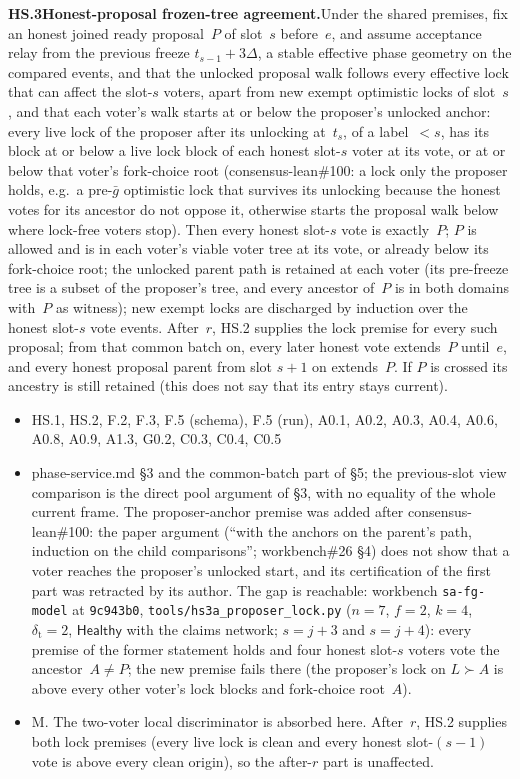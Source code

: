 \documentclass{article}
\newcommand{\dagnode}[6]{%
\par\medskip\noindent\textbf{#1\enspace #2.}\enspace #3
\begin{itemize}[leftmargin=2.2em,itemsep=0pt,topsep=2pt]
\item[\emph{Uses}] #4
\item[\emph{Evid.}] #5
\item[\emph{Task}] #6
\end{itemize}}
\begin{document}
\dagnode{HS.3}{Honest-proposal frozen-tree agreement}{Under the shared
premises, fix an honest joined ready proposal~$P$ of slot~$s$ before~$e$, and
assume acceptance relay from the previous freeze $t_{s-1}+3\Delta$, a stable
effective phase geometry on the compared events, and that the unlocked
proposal walk follows every effective lock that can affect the slot-$s$
voters, apart from new exempt optimistic locks of slot~$s$, and that each
voter's walk starts at or below the proposer's unlocked anchor: every live lock
of the proposer after its unlocking at~$t_s$, of a label~$<s$, has its block at
or below a live lock block of each honest slot-$s$ voter at its vote, or at or
below that voter's fork-choice root (consensus-lean\#100: a lock only the
proposer holds, e.g.\ a pre-$\bar g$ optimistic lock that survives its unlocking
because the honest votes for its ancestor do not oppose it, otherwise starts the
proposal walk below where lock-free voters stop).  Then every honest
slot-$s$ vote is exactly~$P$; $P$ is allowed and is in each voter's viable
voter tree at its vote, or already below its fork-choice root; the unlocked
parent path is retained at each voter (its pre-freeze tree is a subset of the
proposer's tree, and every ancestor of~$P$ is in both domains with~$P$ as
witness); new exempt locks are discharged by induction over the honest
slot-$s$ vote events.  After~$r$, HS.2 supplies the lock premise for every
such proposal; from that common batch on, every later honest vote extends~$P$
until~$e$, and every honest proposal parent from slot $s+1$ on extends~$P$.
If $P$ is crossed its ancestry is still retained (this does not say that its
entry stays current).}
{HS.1, HS.2, F.2, F.3, F.5 (schema), F.5 (run), A0.1, A0.2, A0.3, A0.4,
A0.6, A0.8, A0.9, A1.3, G0.2, C0.3, C0.4, C0.5}{phase-service.md \S3 and the
common-batch part of \S5; the previous-slot view comparison is the direct
pool argument of \S3, with no equality of the whole current frame.  The
proposer-anchor premise was added after consensus-lean\#100: the paper argument
(``with the anchors on the parent's path, induction on the child comparisons'';
workbench\#26 \S4) does not show that a voter reaches the proposer's unlocked
start, and its certification of the first part was retracted by its author.
The gap is reachable: workbench \texttt{sa-fg-model} at \texttt{9c943b0},
\texttt{tools/hs3a\_proposer\_lock.py} ($n=7$, $f=2$, $k=4$, $\delta_{\mathrm t}=2$,
$\mathsf{Healthy}$ with the claims network; $s=j+3$ and $s=j+4$): every
premise of the former statement holds and four honest slot-$s$ voters vote the
ancestor~$A\neq P$; the new premise fails there (the proposer's lock on
$L\succ A$ is above every other voter's lock blocks and fork-choice root~$A$).}{M.  The
two-voter local discriminator is absorbed here.  After~$r$, HS.2 supplies both
lock premises (every live lock is clean and every honest slot-$(s-1)$ vote is
above every clean origin), so the after-$r$ part is unaffected.}
\end{document}
